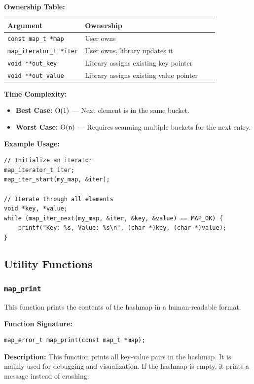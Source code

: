 \documentclass[titlepage]{article}
\begin{document}
\textbf{Ownership Table:}
\begin{center}
\begin{tabular}{@{} l l c c @{} }
\toprule
\textbf{Argument} & \textbf{Ownership}  \\
\midrule
\texttt{const map\_t *map} & User owns  \\
\texttt{map\_iterator\_t *iter} & User owns, library updates it  \\
\texttt{void **out\_key} & Library assigns existing key pointer  \\
\texttt{void **out\_value} & Library assigns existing value pointer  \\
\bottomrule
\end{tabular}
\end{center}

\textbf{Time Complexity:}
\begin{itemize}
    \item \textbf{Best Case:} \( $O(1)$ \) --- Next element is in the same bucket.
    \item \textbf{Worst Case:} \( $O(n)$ \) --- Requires scanning multiple buckets for the next entry.
\end{itemize}

\textbf{Example Usage:}
\begin{verbatim}
// Initialize an iterator
map_iterator_t iter;
map_iter_start(my_map, &iter);

// Iterate through all elements
void *key, *value;
while (map_iter_next(my_map, &iter, &key, &value) == MAP_OK) {
    printf("Key: %s, Value: %s\n", (char *)key, (char *)value);
}
\end{verbatim}

\subsection{Utility Functions}

\subsubsection{\texttt{map\_print}}

This function prints the contents of the hashmap in a human-readable format.

\textbf{Function Signature:}
\begin{verbatim}
map_error_t map_print(const map_t *map);
\end{verbatim}

\textbf{Description:}
This function prints all key-value pairs in the hashmap.
It is mainly used for debugging and visualization.
If the hashmap is empty, it prints a message instead of crashing.
\end{document}
